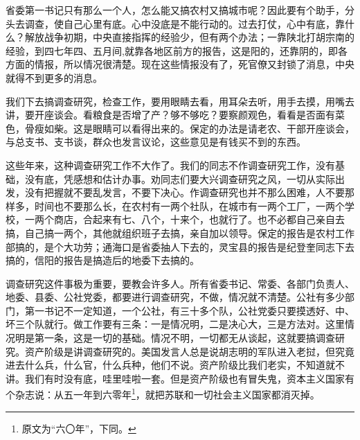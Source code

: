 省委第一书记只有那么一个人，怎么能又搞农村又搞城市呢？因此要有个助手，分头去调查，使自己心里有底。心中没底是不能行动的。过去打仗，心中有底，靠什么？解放战争初期，中央直接指挥的经验少，但有两个办法；一靠陕北打胡宗南的经验，到四七年四、五月间,就靠各地区前方的报告，这是阳的，还靠阴的，即各方面的情报，所以情况很清楚。现在这些情报没有了，死官僚又封锁了消息，中央就得不到更多的消息。

我们下去搞调查研究，检查工作，要用眼睛去看，用耳朵去听，用手去摸，用嘴去讲，要开座谈会。看粮食是否增了产？够不够吃？要察颜观色，看看是否面有菜色，骨瘦如柴。这是眼睛可以看得出来的。保定的办法是请老农、干部开座谈会，与总支书、支书谈，群众也发言议论，这些意见是有钱买不到的东西。

这些年来，这种调查研究工作不大作了。我们的同志不作调查研究工作，没有基础，没有底，凭感想和估计办事。劝同志们要大兴调查研究之风，一切从实际出发，没有把握就不要乱发言，不要下决心。作调查研究也并不那么困难，人不要那样多，时间也不要那么长，在农村有一两个社队，在城市有一两个工厂，一两个学校，一两个商店，合起来有七、八个，十来个，也就行了。也不必都自己亲自去搞，自己搞一两个，其他就组织班子去搞，亲自加以领导。保定的报告是农村工作部搞的，是个大功劳；通海口是省委抽人下去的，灵宝县的报告是纪登奎同志下去搞的，信阳的报告是搞造后的地委下去搞的。

调查研究这件事极为重要，要教会许多人。所有省委书记、常委、各部门负责人、地委、县委、公社党委，都要进行调查研究，不做，情况就不清楚。公社有多少部门，第一书记不一定知道，一个公社，有三十多个队，公社党委只要摸透好、中、坏三个队就行。做工作要有三条：一是情况明，二是决心大，三是方法对。这里情况明是第一条，这是一切的基础。情况不明，一切都无从谈起，这就要搞调查研究。资产阶级是讲调查研究的。美国发言人总是说胡志明的军队进入老挝，但究竟进去什么兵，什么官，什么兵种，他们不说。资产阶级比我们老实，不知道就不讲。我们有时没有底，哇里哇啦一套。但是资产阶级也有冒失鬼，资本主义国家有个杂志说：从五一年到六零年\footnote{原文为“六〇年”，下同。}，就把苏联和一切社会主义国家都消灭掉。

